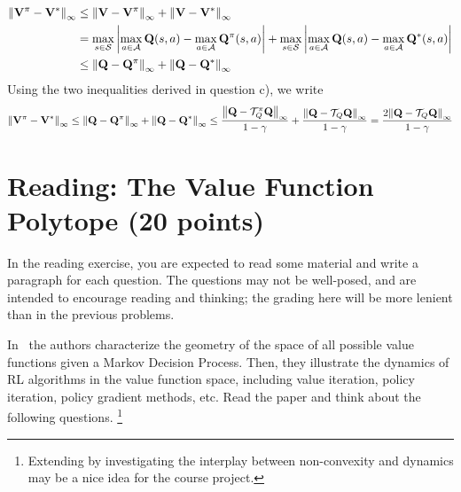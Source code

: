 \begin{Solution}
\begin{enumerate} [label=\alph*)]
$$\begin{aligned}
        \norm{\mathbf{V}^{\pi} - \mathbf{V}^{*}}_\infty & \leq \norm{\mathbf{V} - \mathbf{V}^\pi}_\infty + \norm{\mathbf{V} - \mathbf{V}^{*}}_\infty \\
        & = \max_{s \in \mathcal{S}} \abs{\max_{a \in \mathcal{A}} \mathbf{Q}(s,a) - \max_{a \in \mathcal{A}} \mathbf{Q}^\pi(s,a)} + \max_{s \in \mathcal{S}} \abs{\max_{a \in \mathcal{A}} \mathbf{Q}(s,a) - \max_{a \in \mathcal{A}} \mathbf{Q}^*(s,a)} \\
        & \leq \norm{\mathbf{Q} - \mathbf{Q}^\pi}_\infty + \norm{\mathbf{Q} - \mathbf{Q}^{*}}_\infty
        \end{aligned}
        $$
        Using the two inequalities derived in question c), we write
        $$
        \norm{\mathbf{V}^{\pi} - \mathbf{V}^{*}}_\infty \leq \norm{\mathbf{Q} - \mathbf{Q}^\pi}_\infty + \norm{\mathbf{Q} - \mathbf{Q}^{*}}_\infty \leq \frac{\norm{\mathbf{Q} - \mathcal{T}_Q^\pi \mathbf{Q}}_\infty}{1-\gamma} + \frac{\norm{\mathbf{Q} - \mathcal{T}_Q \mathbf{Q}}_\infty}{1-\gamma} = \frac{2 \norm{\mathbf{Q} - \mathcal{T}_Q \mathbf{Q}}_\infty}{1-\gamma}
        $$
    \end{enumerate}
\end{Solution}


\clearpage




\section{Reading: The Value Function Polytope (20 points)}
In the reading exercise, you are expected to read some material and write a paragraph for each question.
The questions may not be well-posed, and are intended to encourage reading and thinking;
the grading here will be more lenient than in the previous problems.

In~\cite{dadashi2019value} the authors characterize the geometry of the space of all possible value functions given a Markov Decision Process. Then, they illustrate the dynamics of RL algorithms in the value function space, including value iteration, policy iteration, policy gradient methods, etc. Read the paper \cite{dadashi2019value} and think about the following questions. \footnote{Extending \cite{dadashi2019value} by investigating the interplay between non-convexity and dynamics
may be a nice idea for the course project.}

